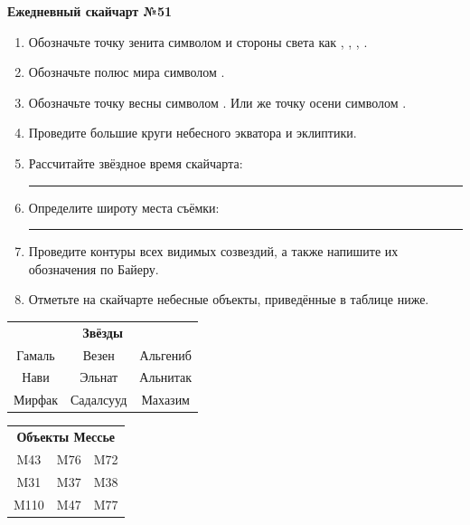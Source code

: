 \documentclass{./SAS-class-skygen}
\begin{document}
    
    
    
	\begin{center}
		\large\textbf{Ежедневный скайчарт №51}
	\end{center}

	\begin{enumerate}
		\item Обозначьте точку зенита символом  и стороны света как , , , .
		\item Обозначьте полюс мира символом .
		\item Обозначьте точку весны символом \Aries. Или же точку осени символом \Libra.
		\item Проведите большие круги небесного экватора и эклиптики.
		\item Рассчитайте звёздное время скайчарта: \rule{2cm}{0.4pt}
		\item Определите широту места съёмки: \rule{2cm}{0.4pt}
		\item Проведите контуры всех видимых созвездий, а также напишите их обозначения по Байеру.
		\item Отметьте на скайчарте небесные объекты, приведённые в таблице ниже.
	\end{enumerate}
	
    \vspace{0.5cm}

    \begin{table}[h!]
    \centering
    \begin{tabular}{ccc}
    \multicolumn{3}{c}{\textbf{Звёзды}} \\ Гамаль & Везен & Альгениб \\
Нави & Эльнат & Альнитак \\
Мирфак & Садалсууд & Махазим \\

\end{tabular}
    \hfill
    \begin{tabular}{ccc}
    \multicolumn{3}{c}{\textbf{Объекты Мессье}} \\ M43 & M76 & M72 \\
M31 & M37 & M38 \\
M110 & M47 & M77 \\

\end{tabular}
    \end{table}
	
\end{document}
